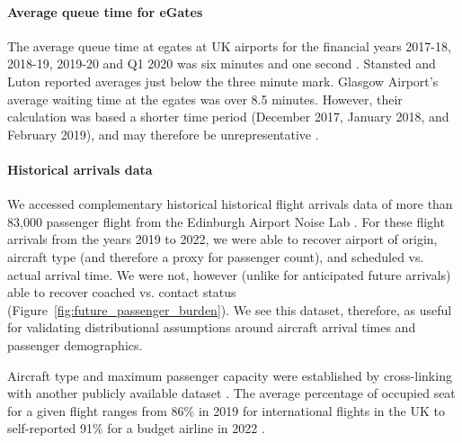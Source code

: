 \documentclass[10pt]{article}
\begin{document}
\paragraph{Average queue time for eGates}
The average queue time at \glspl{egate} at UK airports for the financial years 2017-18, 2018-19, 2019-20 and Q1 2020 was six minutes and one second \cite{Inspection_eGates}. Stansted and Luton reported averages just below the three minute mark. Glasgow Airport's average waiting time at the \glspl{egate} was over 8.5 minutes. However, their calculation was based a shorter time period (December 2017, January 2018, and February 2019), and may therefore be unrepresentative \cite{Inspection_eGates}.


\paragraph{Historical arrivals data}
We accessed complementary historical historical flight arrivals data of more than 83,000 passenger flight from the Edinburgh Airport Noise Lab \cite{noise_lab}. For these flight arrivals from the years 2019 to 2022, we were able to recover airport of origin, aircraft type (and therefore a proxy for passenger count), and scheduled vs. actual arrival time. We were not, however (unlike for anticipated future arrivals) able to recover coached vs. contact status (Figure~\ref{fig:future_passenger_burden}). We see this dataset, therefore, as useful for validating distributional assumptions around aircraft arrival times and passenger demographics. 

% 

Aircraft type and maximum passenger capacity were established by cross-linking with another publicly available dataset \cite{aircraft_capacity}. The average percentage of occupied seat for a given flight ranges from 86\% in 2019 for international flights in the UK \cite{loading_factor_national} to self-reported 91\% for a budget airline in 2022 \cite{loading_factor_ryanair}.
\end{document}
